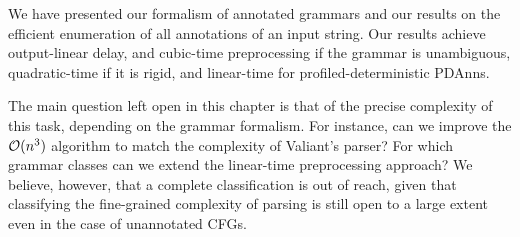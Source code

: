 %
%

We have presented our formalism of annotated grammars and our results on the
efficient enumeration of all annotations of an input string. Our results achieve
output-linear delay, and cubic-time preprocessing if the grammar is unambiguous,
quadratic-time if it is rigid, and linear-time for profiled-deterministic PDAnns.

The main question left open in this chapter is that of the precise complexity of
this task, depending on the grammar formalism. For instance, can we improve the 
$\mathcal{O}(n^3)$ algorithm to match the complexity of Valiant's parser? For which grammar
classes can we extend the linear-time preprocessing approach? We believe,
however, that a complete classification is out of reach, given that classifying
the fine-grained complexity of parsing is still open to a large extent even in
the case of unannotated CFGs.
